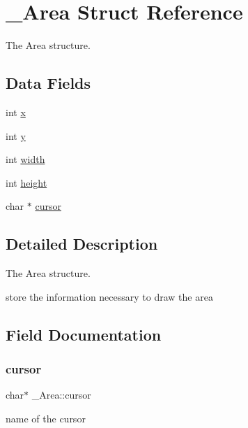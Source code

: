\hypertarget{struct__Area}{}\section{\+\_\+\+Area Struct Reference}
\label{struct__Area}


The Area structure.  


\subsection*{Data Fields}
\begin{DoxyCompactItemize}
\item 
int \hyperlink{struct__Area_a093b8c2929094bac88bbf5ee7db85573}{x}
\item 
int \hyperlink{struct__Area_a867e601f05480db03237c3a17d4c77f8}{y}
\item 
int \hyperlink{struct__Area_aa2f753fc3d254821603ac4512db814f1}{width}
\item 
int \hyperlink{struct__Area_a22627de8e529d631c17157f1f68cb5ac}{height}
\item 
char $\ast$ \hyperlink{struct__Area_aa042b0549789b75fd133b67ad7d0fd9d}{cursor}
\end{DoxyCompactItemize}


\subsection{Detailed Description}
The Area structure. 

store the information necessary to draw the area 

\subsection{Field Documentation}
\mbox{\label{struct__Area_aa042b0549789b75fd133b67ad7d0fd9d}} 
\subsubsection{\texorpdfstring{cursor}{cursor}}
{\footnotesize\ttfamily char$\ast$ \+\_\+\+Area\+::cursor}

name of the cursor \mbox{\label{struct__Area_a22627de8e529d631c17157f1f68cb5ac}} 
